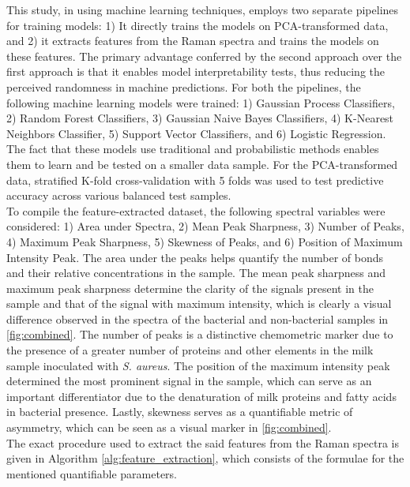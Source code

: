 This study, in using machine learning techniques, employs two separate pipelines for training models: 1) It directly trains the models on PCA-transformed data, and 2) it extracts features from the Raman spectra and trains the models on these features. The primary advantage conferred by the second approach over the first approach is that it enables model interpretability tests, thus reducing the perceived randomness in machine predictions. For both the pipelines, the following machine learning models were trained: 1) Gaussian Process Classifiers, 2) Random Forest Classifiers, 3) Gaussian Naive Bayes Classifiers, 4) K-Nearest Neighbors Classifier, 5) Support Vector Classifiers, and 6) Logistic Regression. The fact that these models use traditional and probabilistic methods enables them to learn and be tested on a smaller data sample. For the PCA-transformed data, stratified K-fold cross-validation with 5 folds was used to test predictive accuracy across various balanced test samples. \\

\noindent To compile the feature-extracted dataset, the following spectral variables were considered: 1) Area under Spectra, 2) Mean Peak Sharpness, 3) Number of Peaks, 4) Maximum Peak Sharpness, 5) Skewness of Peaks, and 6) Position of Maximum Intensity Peak. The area under the peaks helps quantify the number of bonds and their relative concentrations in the sample. The mean peak sharpness and maximum peak sharpness determine the clarity of the signals present in the sample and that of the signal with maximum intensity, which is clearly a visual difference observed in the spectra of the bacterial and non-bacterial samples in \autoref{fig:combined}. The number of peaks is a distinctive chemometric marker due to the presence of a greater number of proteins and other elements in the milk sample inoculated with \textit{S. aureus}. The position of the maximum intensity peak determined the most prominent signal in the sample, which can serve as an important differentiator due to the denaturation of milk proteins and fatty acids in bacterial presence. Lastly, skewness serves as a quantifiable metric of asymmetry, which can be seen as a visual marker in \autoref{fig:combined}.
\\

\noindent The exact procedure used to extract the said features from the Raman spectra is given in Algorithm \autoref{alg:feature_extraction}, which consists of the formulae for the mentioned quantifiable parameters. \\

